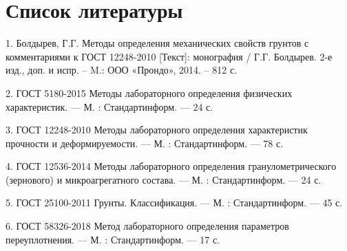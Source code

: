 
\chapter*{Список литературы}

1. Болдырев, Г.Г. Методы определения механических свойств грунтов с комментариями к
ГОСТ 12248-2010 [Текст]: монография / Г.Г. Болдырев. 2-е изд., доп.
и испр. – M.: ООО «Прондо», 2014. – 812 с.

2. ГОСТ 5180-2015 Методы лабораторного определения физических характеристик. --- М. 
   : Стандартинформ. --- 24 с. 

3. ГОСТ 12248-2010 Методы лабораторного определения характеристик
   прочности и деформируемости. --- М. : Стандартинформ. --- 78 с.

4. ГОСТ 12536-2014 Методы лабораторного определения гранулометрического
(зернового) и микроагрегатного состава. --- М. : Стандартинформ.
--- 24 с.

5. ГОСТ 25100-2011 Грунты. Классификация. --- М. : Стандартинформ.
--- 45 с.

6. ГОСТ 58326-2018 Метод лабораторного определения параметров переуплотнения. --- М. 
: Стандартинформ. --- 17 с.


